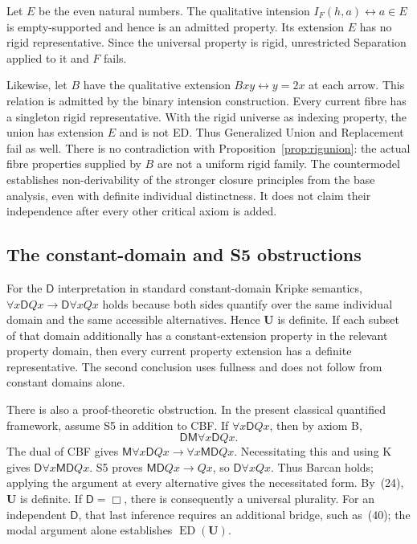 \documentclass[11pt]{article}
\theoremstyle{definition}
\newcommand{\D}{\mathsf D}
\newcommand{\poss}{\mathsf M}
\newcommand{\ED}{\operatorname{ED}}
\newcommand{\U}{\mathbf U}
\numberwithin{equation}{section}
\begin{document}
Let $E$ be the even natural numbers. The qualitative intension $I_F(h,a)\leftrightarrow a\in E$ is empty-supported and hence is an admitted property. Its extension $E$ has no rigid representative. Since the universal property is rigid, unrestricted Separation applied to it and $F$ fails.

Likewise, let $B$ have the qualitative extension $Bxy\leftrightarrow y=2x$ at each arrow. This relation is admitted by the binary intension construction. Every current fibre has a singleton rigid representative. With the rigid universe as indexing property, the union has extension $E$ and is not ED. Thus Generalized Union and Replacement fail as well. There is no contradiction with Proposition~\ref{prop:rigunion}: the actual fibre properties supplied by $B$ are not a uniform rigid family. The countermodel establishes non-derivability of the stronger closure principles from the base analysis, even with definite individual distinctness. It does not claim their independence after every other critical axiom is added.

\subsection{The constant-domain and S5 obstructions}

For the $\D $ interpretation in standard constant-domain Kripke semantics, $\forall x\D Qx\rightarrow\D\forall xQx$ holds because both sides quantify over the same individual domain and the same accessible alternatives. Hence $\U$ is definite. If each subset of that domain additionally has a constant-extension property in the relevant property domain, then every current property extension has a definite representative. The second conclusion uses fullness and does not follow from constant domains alone.

There is also a proof-theoretic obstruction. In the present classical quantified framework, assume S5 in addition to CBF. If $\forall x\D Qx$, then by axiom B,
$$
\D\poss\forall x\D Qx.
$$
The dual of CBF gives $\poss\forall x\D Qx\rightarrow\forall x\poss\D Qx$. Necessitating this and using K gives $\D\forall x\poss\D Qx$. S5 proves $\poss\D Qx\rightarrow Qx$, so $\D\forall xQx$. Thus Barcan holds; applying the argument at every alternative gives the necessitated form. By~\textup{(24)}, $\U$ is definite. If $\D =\Box$, there is consequently a universal plurality. For an independent $\D $, that last inference requires an additional bridge, such as~\textup{(40)}; the modal argument alone establishes $\ED(\U)$.
\end{document}
